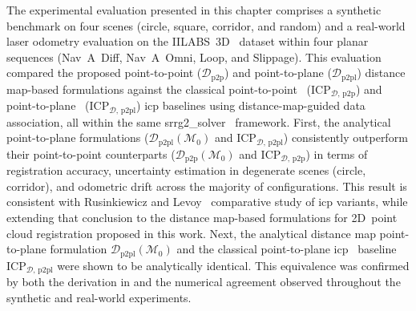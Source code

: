 The experimental evaluation presented in this chapter comprises a synthetic
benchmark on four scenes (circle, square, corridor, and random) and
a real-world laser odometry evaluation on
the IILABS~3D~\cite{ribeiro:access:2025} dataset within four planar sequences
(Nav~A~Diff, Nav~A~Omni, Loop, and Slippage). This evaluation compared
the proposed point-to-point ($\mathcal{D}_\mathrm{p2p}$) and point-to-plane
($\mathcal{D}_\mathrm{p2pl}$) distance map-based formulations against
the classical point-to-point~\cite{besl-mckay:tpami:1992}
($\mathrm{ICP}_{\mathcal{D},\,\mathrm{p2p}}$) and
point-to-plane~\cite{chen-medioni:icra:1991}
($\mathrm{ICP}_{\mathcal{D},\,\mathrm{p2pl}}$) \gls{icp} baselines using
distance-map-guided data association, all within the same
srrg2\_solver~\cite{grisetti:robotics:2020} framework.
First, the analytical point-to-plane formulations
($\mathcal{D}_\mathrm{p2pl}(\mathcal{M}_0)$ and
$\mathrm{ICP}_{\mathcal{D},\,\mathrm{p2pl}}$)
consistently outperform their point-to-point counterparts
($\mathcal{D}_\mathrm{p2p}(\mathcal{M}_0)$ and
$\mathrm{ICP}_{\mathcal{D},\,\mathrm{p2p}}$) in terms of registration accuracy,
uncertainty estimation in degenerate scenes (circle, corridor), and
odometric drift across the majority of configurations.
This result is consistent with
Rusinkiewicz and Levoy~\cite{rusinkiewicz-levoy:im:2001} comparative study of
\gls{icp} variants, while extending that conclusion to the distance map-based
formulations for 2D~point cloud registration proposed in this work.
Next, the analytical distance map point-to-plane formulation
$\mathcal{D}_\mathrm{p2pl}(\mathcal{M}_0)$ and the classical point-to-plane
\gls{icp}~\cite{chen-medioni:icra:1991} baseline
$\mathrm{ICP}_{\mathcal{D},\,\mathrm{p2pl}}$ were shown to be analytically
identical. This equivalence was confirmed by both the derivation in
 and the numerical agreement
observed throughout the synthetic and real-world experiments.

